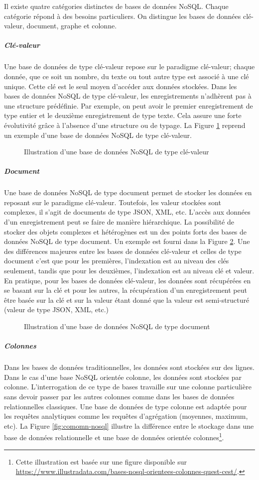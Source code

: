 	Il existe quatre catégories distinctes de bases de données NoSQL. Chaque catégorie répond  à des besoins particuliers. On distingue les bases de données clé-valeur, document, graphe et colonne.
	\subparagraph {Clé-valeur} Une base de données de type clé-valeur repose sur le paradigme clé-valeur; chaque donnée, que ce soit un nombre, du texte ou tout autre type est associé à une clé unique. Cette clé est le seul moyen d'accéder aux données stockées.
	Dans les bases de données NoSQL de type clé-valeur, les enregistrements  n'adhèrent pas à une structure prédéfinie. Par exemple, on peut avoir le premier enregistrement de type entier et le deuxième enregistrement de type texte. Cela assure une forte évolutivité grâce à l'absence d'une structure ou de typage. La Figure \ref{fig:key-value-nosql} reprend un exemple d'une base de données NoSQL de type clé-valeur.
	\begin{figure}[h]
		\captionsetup{justification=centering}
		\centering
		\resizebox{.4\textwidth}{!}{
			
	    }
		\caption{Illustration d'une base de données NoSQL de type clé-valeur}
		\label{fig:key-value-nosql}
	\end{figure}
		\subparagraph{Document} Une base de données NoSQL de type document permet de stocker les données en reposant sur le paradigme clé-valeur. Toutefois, les valeur stockées sont complexes, il s'agit de documents de type JSON, XML, etc. L'accès aux données d'un enregistrement peut se faire de manière hiérarchique. La possibilité de stocker des objets complexes et hétérogènes  est un des points forts des bases de données NoSQL de type  document. Un exemple est fourni dans la Figure \ref{fig:document-nosql}. Une des différences majeures entre les bases de données clé-valeur et celles de type document c'est que pour les premières, l'indexation est au niveau  des clés seulement, tandis que pour les deuxièmes, l'indexation est au niveau clé et valeur. En pratique, pour les bases de données clé-valeur, les données sont récupérées en se basant sur la clé et pour les autres, la récupération d'un enregistrement peut être basée sur la clé et sur la valeur étant donné que la valeur est semi-structuré (valeur de type JSON, XML, etc.)
		\begin{figure}[h]
			\centering
				\resizebox{\textwidth}{!}{
			
		}
			\caption{Illustration d'une base de données NoSQL de type document}
			\label{fig:document-nosql}
		\end{figure}
		\subparagraph{Colonnes} Dans les bases de données traditionnelles, les données sont stockées sur des lignes. Dans le cas d'une base NoSQL orientée colonne, les données sont stockées par colonne. L'interrogation de ce type de bases travaille sur une colonne particulière sans devoir passer par les autres colonnes comme dans les bases de données relationnelles classiques. Une base de données de type colonne est adaptée pour les requêtes analytiques comme les requêtes d'agrégation (moyennes, maximum, etc). La Figure \ref{fig:comomn-nosql} illustre la différence entre le stockage dans une base de données relationnelle et une base de données orientée colonnes\footnote{Cette illustration  est basée sur une figure disponible sur \url{https://www.illustradata.com/bases-nosql-orientees-colonnes-quest-cest/}.}.
